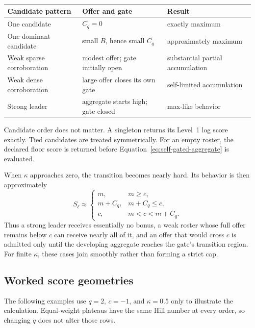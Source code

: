 \documentclass[11pt]{article}
\begin{document}
\begin{center}
\small
\begin{tabularx}{0.96\textwidth}{@{}>{\raggedright\arraybackslash}p{}>{\raggedright\arraybackslash}p{}>{\raggedright\arraybackslash}X@{}}
\toprule
Candidate pattern & Offer and gate & Result \\
\midrule
One candidate & $C_q=0$ & exactly maximum \\
One dominant candidate & small $B$, hence small $C_q$ & approximately maximum \\
Weak sparse corroboration & modest offer; gate initially open & substantial partial accumulation \\
Weak dense corroboration & large offer closes its own gate & self-limited accumulation \\
Strong leader & aggregate starts high; gate closed & max-like behavior \\
\bottomrule
\end{tabularx}
\end{center}

Candidate order does not matter. A singleton returns its Level~1 log score
exactly. Tied candidates are treated symmetrically. For an empty roster, the
declared floor score is returned before Equation~\eqref{eq:self-gated-aggregate}
is evaluated.

When $\kappa$ approaches zero, the transition becomes nearly hard. Its
behavior is then approximately
\begin{equation}
S_\ell
\approx
\begin{cases}
m, & m\geq c,\\
m+C_q, & m+C_q\leq c,\\
c, & m<c<m+C_q.
\end{cases}
\label{eq:hard-gate-limit}
\end{equation}
Thus a strong leader receives essentially no bonus, a weak roster whose full
offer remains below $c$ can receive nearly all of it, and an offer that would
cross $c$ is admitted only until the developing aggregate reaches the gate's
transition region. For finite $\kappa$, these cases join smoothly rather than
forming a strict cap.

\clearpage
\subsection{Worked score geometries}

The following examples use $q=2$, $c=-1$, and $\kappa=0.5$ only to illustrate
the calculation. Equal-weight plateaus have the same Hill number at every
order, so changing $q$ does not alter those rows.
\end{document}
